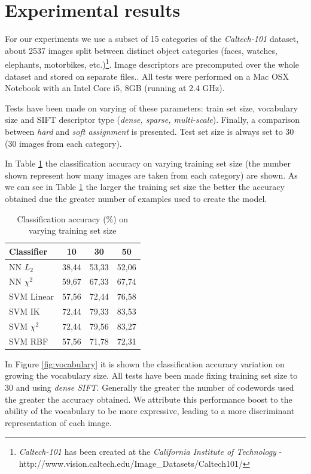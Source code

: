 \section{Experimental results}

For our experiments we use a subset of 15 categories of the \emph{Caltech-101} dataset, about 2537 images split between distinct object categories (faces, watches, elephants, motorbikes, etc.)\footnote{\emph{Caltech-101} has been created at the \emph{California Institute of Technology} - http://www.vision.caltech.edu/Image_Datasets/Caltech101/}. Image descriptors are precomputed over the whole dataset and stored on separate files.. All tests were performed on a Mac OSX Notebook with an Intel Core i5, 8GB (running at 2.4 GHz).

Tests have been made on varying of these parameters: train set size, vocabulary size and SIFT descriptor type (\emph{dense, sparse, multi-scale}). Finally, a comparison between \emph{hard} and \emph{soft assignment} is presented. Test set size is always set to 30 (30 images from each category).

In Table \ref{tab:trainsetsize} the classification accuracy on varying training set size (the number shown represent how many images are taken from each category) are shown. As we can see in Table \ref{tab:trainsetsize} the larger the training set size the better the accuracy obtained due the greater number of examples used to create the model.

\begin{table}[h]
\begin{center}
\begin{tabular}{|l|c|c|c|}
\hline
Classifier & 10 & 30 & 50\\
\hline\hline
NN $L_2$ & 38,44 & 53,33 & 52,06\\
NN $\chi^2$ & 59,67 & 67,33 & 67,74\\
SVM Linear & 57,56 & 72,44 & 76,58\\
SVM IK & 72,44 & 79,33 & 83,53\\
SVM $\chi^2$ & 72,44 & 79,56 & 83,27\\
SVM RBF & 57,56 & 71,78 & 72,31 \\
\hline
\end{tabular}
\end{center}
\label{tab:trainsetsize}
\caption{Classification accuracy (\%) on varying training set size}
\end{table}

In Figure \ref{fig:vocabulary} it is shown the classification accuracy variation on growing the vocabulary size. All tests have been made fixing training set size to 30 and using \emph{dense SIFT}. Generally the greater the number of codewords used the greater the accuracy obtained. We attribute this performance boost to the ability of the vocabulary to be more expressive, leading to a more discriminant representation of each image.

